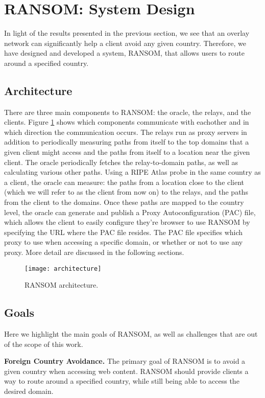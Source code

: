 \section{RANSOM: System Design}
In light of the results presented in the previous section, we see that an 
overlay network can significantly help a client avoid any given country.  
Therefore, we have designed and developed a system, RANSOM, that allows users 
to route around a specified country.

\subsection{Architecture}

There are three main components to RANSOM: the oracle, the relays, and the 
clients.  Figure \ref{fig:arch} shows which components communicate with 
eachother and in which direction the communication occurs.  The relays run as 
proxy servers in addition to periodically measuring paths from itself to the 
top domains that a given client might access and the paths from itself to a 
location near the given client.  The oracle periodically fetches the 
relay-to-domain paths, as well as calculating various other paths.  Using a RIPE
 Atlas probe in the same country as a client, the oracle can measure: the paths
 from a location close to the client (which we will refer to as the client from 
now on) to the relays, and the paths from the client to the domains.  Once these
 paths are mapped to the country level, the oracle can generate and publish a 
Proxy Autoconfiguration (PAC) file, which allows the client to easily configure 
they're browser to use RANSOM by specifying the URL where the PAC file resides.
  The PAC file specifies which proxy to use when accessing a specific domain, 
or whether or not to use any proxy.  More detail are discussed in the following 
sections.

\begin{figure}[t]
\centering
\texttt{[image: architecture]}
\caption{RANSOM architecture.}
\label{fig:arch}
\end{figure}

\subsection{Goals}
Here we highlight the main goals of RANSOM, as well as challenges that are out 
of the scope of this work.

{\bf Foreign Country Avoidance.}  The primary goal of RANSOM is to avoid a given
 country when accessing web content.  RANSOM should provide clients a way to 
route around a specified country, while still being able to access the desired 
domain.

